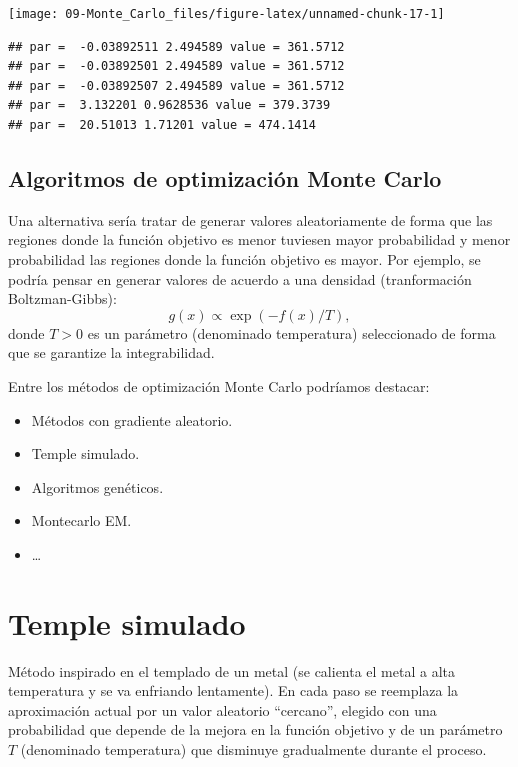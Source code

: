 \documentclass[
]{book}
\theoremstyle{break}
\theoremstyle{definition}
\theoremstyle{definition}
\theoremstyle{definition}
\theoremstyle{remark}
\begin{document}
\begin{center}\texttt{[image: 09-Monte\_Carlo\_files/figure-latex/unnamed-chunk-17-1]} \end{center}

\begin{verbatim}
## par =  -0.03892511 2.494589 value = 361.5712 
## par =  -0.03892501 2.494589 value = 361.5712 
## par =  -0.03892507 2.494589 value = 361.5712 
## par =  3.132201 0.9628536 value = 379.3739 
## par =  20.51013 1.71201 value = 474.1414
\end{verbatim}

\hypertarget{algoritmos-de-optimizaciuxf3n-monte-carlo}{%
\subsection{Algoritmos de optimización Monte Carlo}\label{algoritmos-de-optimizaciuxf3n-monte-carlo}}

Una alternativa sería tratar de generar valores aleatoriamente de
forma que las regiones donde la función objetivo es menor tuviesen
mayor probabilidad y menor probabilidad las regiones donde la
función objetivo es mayor.
Por ejemplo, se podría pensar en generar valores de acuerdo a una
densidad (tranformación
Boltzman-Gibbs):
\[g(x)\propto \exp \left( -f(x)/T\right) ,\]donde
\(T>0\) es un parámetro (denominado temperatura) seleccionado de forma
que se garantize la integrabilidad.

Entre los métodos de optimización Monte Carlo podríamos destacar:

\begin{itemize}
\item
  Métodos con gradiente aleatorio.
\item
  Temple simulado.
\item
  Algoritmos genéticos.
\item
  Montecarlo EM.
\item
  \ldots{}
\end{itemize}

\hypertarget{temple-simulado}{%
\section{Temple simulado}\label{temple-simulado}}

Método inspirado en el templado de un metal (se calienta el metal a
alta temperatura y se va enfriando lentamente).
En cada paso se reemplaza la aproximación actual por un valor
aleatorio ``cercano'', elegido con una probabilidad que depende de la
mejora en la función objetivo y de un parámetro \(T\)
(denominado temperatura) que disminuye gradualmente durante
el proceso.
\end{document}
